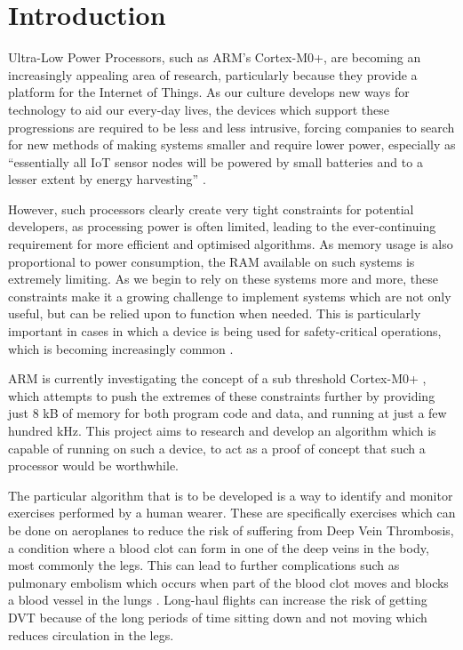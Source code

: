 \chapter{Introduction}

Ultra-Low Power Processors, such as ARM's Cortex-M0+, are becoming an increasingly appealing area of research, particularly because they provide a platform for the Internet of Things. As our culture develops new ways for technology to aid our every-day lives, the devices which support these progressions are required to be less and less intrusive, forcing companies to search for new methods of making systems smaller and require lower power, especially as ``essentially all IoT sensor nodes will be powered by small batteries and to a lesser extent by energy harvesting'' \cite{iot_power}.

However, such processors clearly create very tight constraints for potential developers, as processing power is often limited, leading to the ever-continuing requirement for more eﬃcient and optimised algorithms. As memory usage is also proportional to power consumption, the RAM available on such systems is extremely limiting. As we begin to rely on these systems more and more, these constraints make it a growing challenge to implement systems which are not only useful, but can be relied upon to function when needed. This is particularly important in cases in which a device is being used for safety-critical operations, which is becoming increasingly common \cite{iot_saftey} \cite{iot_saftey2}.

ARM is currently investigating the concept of a sub threshold Cortex-M0+ \cite{arm_sub}, which attempts to push the extremes of these constraints further by providing just 8 kB of memory for both program code and data, and running at just a few hundred kHz. This project aims to research and develop an algorithm which is capable of running on such a device, to act as a proof of concept that such a processor would be worthwhile.


The particular algorithm that is to be developed is a way to identify and monitor exercises performed by a human wearer. These are speciﬁcally exercises which can be done on aeroplanes to reduce the risk of suﬀering from Deep Vein Thrombosis, a condition where a blood clot can form in one of the deep veins in the body, most commonly the legs. This can lead to further complications such as pulmonary embolism which occurs when part of the blood clot moves and blocks a blood vessel in the lungs \cite{dvt}. Long-haul ﬂights can increase the risk of getting DVT because of the long periods of time sitting down and not moving which reduces circulation in the legs.

